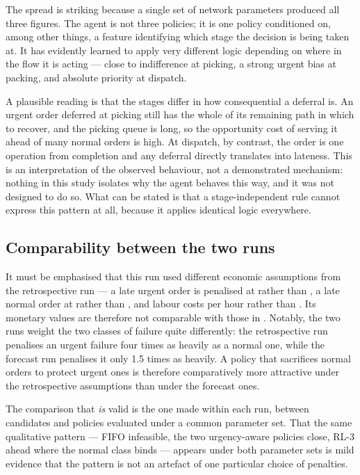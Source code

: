 The spread is striking because a single set of network parameters produced all three figures.
The agent is not three policies; it is one policy conditioned on, among other things, a feature
identifying which stage the decision is being taken at. It has evidently learned to apply very
different logic depending on where in the flow it is acting --- close to indifference at
picking, a strong urgent bias at packing, and absolute priority at dispatch.

A plausible reading is that the stages differ in how consequential a deferral is. An urgent
order deferred at picking still has the whole of its remaining path in which to recover, and the
picking queue is long, so the opportunity cost of serving it ahead of many normal orders is
high. At dispatch, by contrast, the order is one operation from completion and any deferral
directly translates into lateness. This is an interpretation of the observed behaviour, not a
demonstrated mechanism: nothing in this study isolates why the agent behaves this way, and it
was not designed to do so. What can be stated is that a stage-independent rule cannot express
this pattern at all, because it applies identical logic everywhere.

\subsection{Comparability between the two runs}

It must be emphasised that this run used different economic assumptions from the retrospective
run --- a late urgent order is penalised at  rather than , a late normal order
at  rather than , and labour costs  per hour rather than . Its
monetary values are therefore not comparable with those in
. Notably, the two runs weight the two
classes of failure quite differently: the retrospective run penalises an urgent failure four
times as heavily as a normal one, while the forecast run penalises it only \num{1.5} times as
heavily. A policy that sacrifices normal orders to protect urgent ones is therefore
comparatively more attractive under the retrospective assumptions than under the forecast ones.

The comparison that \emph{is} valid is the one made within each run, between candidates and
policies evaluated under a common parameter set. That the same qualitative pattern --- FIFO
infeasible, the two urgency-aware policies close, RL-3 ahead where the normal class binds ---
appears under both parameter sets is mild evidence that the pattern is not an artefact of one
particular choice of penalties.

